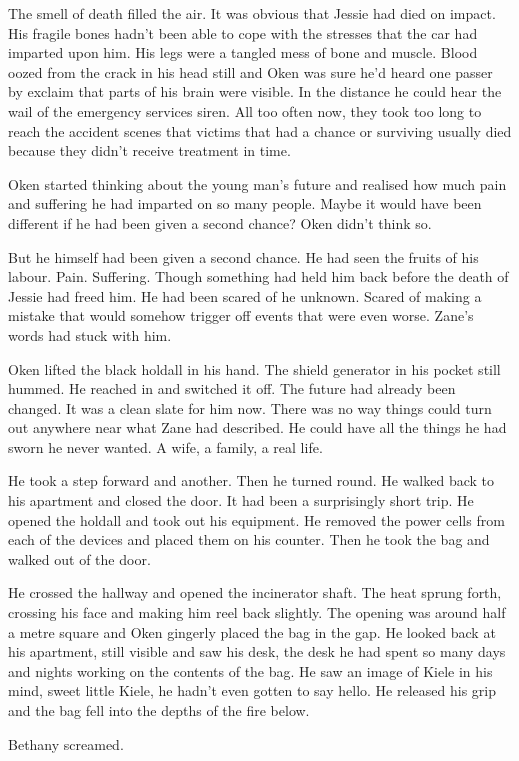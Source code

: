 The smell of death filled the air.  It was obvious that Jessie had died on impact.  His fragile bones hadn't been able to cope with the stresses that the car had imparted upon him.  His legs were a tangled mess of bone and muscle.  Blood oozed from the crack in his head still and Oken was sure he'd heard one passer by exclaim that parts of his brain were visible.  In the distance he could hear the wail of the emergency services siren.  All too often now, they took too long to reach the accident scenes that victims that had a chance or surviving usually died because they didn't receive treatment in time.  

Oken started thinking about the young man's future and realised how much pain and suffering he had imparted on so many people.  Maybe it would have been different if he had been given a second chance?  Oken didn't think so.

But he himself had been given a second chance.  He had seen the fruits of his labour.  Pain.  Suffering.  Though something had held him back before the death of Jessie had freed him.  He had been scared of he unknown.  Scared of making a mistake that would somehow trigger  off events that were even worse.  Zane's words had stuck with him.  

Oken lifted the black holdall in his hand.  The shield generator in his pocket still hummed.  He reached in and switched it off.  The future had already been changed.  It was a clean slate for him now.  There was no way things could turn out anywhere near what Zane had described.  He could have all the things he had sworn he never wanted.  A wife, a family, a real life.  

He took a step forward and another.  Then he turned round.  He walked back to his apartment and closed the door.  It had been a surprisingly short trip.  He opened the holdall and took out his equipment.  He removed the power cells from each of the devices and placed them on his counter.  Then he took the bag and walked out of the door.  

He crossed the hallway and opened the incinerator shaft.  The heat sprung forth, crossing his face and making him reel back slightly.  The opening was around half a metre square and Oken gingerly placed the bag in the gap.  He looked back at his apartment, still visible and saw his desk, the desk he had spent so many days and nights working on the contents of the bag.  He saw an image of Kiele in his mind, sweet little Kiele, he hadn't even gotten to say hello.  He released his grip and the bag fell into the depths of the fire below.

Bethany screamed.

